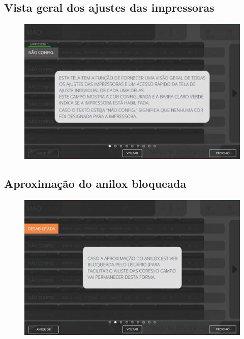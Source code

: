 \newpage
\thispagestyle{fancy}
\vspace{\fill}

\subsection{Vista geral dos ajustes das impressoras}
\begin{figure}
    \centering
    \includegraphics[width=480 px,height=300 px]{src/imagesICV/04-printters/01-printters/settings/1.png}
\end{figure}

\newpage
\thispagestyle{fancy}
\vspace{\fill}

\subsection{Aproximação do anilox bloqueada}
\begin{figure}
    \centering
    \includegraphics[width=576 px,height=360 px]{src/imagesICV/04-printters/01-printters/settings/2.png}
\end{figure}
\newpage
\thispagestyle{fancy}
\vspace{\fill}

